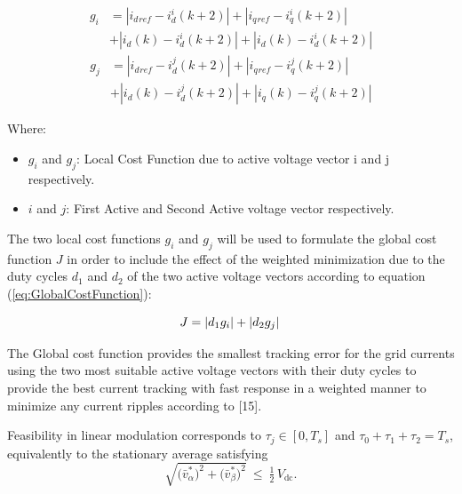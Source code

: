 \begin{equation}
	\begin{split}
		g_i &= \left| i_d{}_{ref} - i^{i}_{d}(k+2) \right| + \left| i_q{}_{ref} - i^{i}_{q}(k+2) 
	    \right| \\ 	    	
	    &+ \left| i_d(k) - i^{i}_{d}(k+2) \right|
	    + \left| i_d(k) - i^{i}_{d}(k+2) \right|
    \end{split}
    \label{eq:CostFunctioni}
\end{equation}
\begin{equation}
	\begin{split}
		g_j &= \left| i_d{}_{ref} - i^{j}_{d}(k+2) \right| + \left| i_q{}_{ref} - i^{j}_{q}(k+2) 
		\right| \\ 	    	
		&+ \left| i_d(k) - i^{j}_{d}(k+2) \right|
		+ \left| i_q(k) - i^{j}_{q}(k+2) \right|
	\end{split}
	\label{eq:CostFunctionj}
\end{equation}

\noindent Where:
\begin{itemize}
	\item $g_i$ and $g_j$: Local Cost Function due to active voltage vector i and j respectively.
	\item $i$ and $j$: First Active and Second Active voltage vector respectively.
\end{itemize}

The two local cost functions $g_i$ and $g_j$ will be used to formulate the global cost function $J$ in order to include the effect of the weighted minimization due to the duty cycles $d_1$ and $d_2$ of the two active voltage vectors according to equation (\ref{eq:GlobalCostFunction}):

\begin{equation}
	J = \left| d_1 g_i \right| + \left| d_2 g_j \right|   \\
	\label{eq:GlobalCostFunction}
\end{equation}

The Global cost function provides the smallest tracking error for the grid currents using the two most suitable active voltage vectors with their duty cycles to provide the best current tracking with fast response in a weighted manner to minimize any current ripples according to [15].

 Feasibility in linear modulation corresponds to $\tau_j\in[0,T_s]$ and $\tau_0+\tau_1+\tau_2=T_s$, equivalently to the stationary average satisfying
\begin{equation}
\label{eq:m2pc-vlimit}
\sqrt{\big(\bar v_\alpha^\ast\big)^2+\big(\bar v_\beta^\ast\big)^2}\ \le\ \tfrac{1}{2}\,V_{\mathrm{dc}}.
\end{equation}

